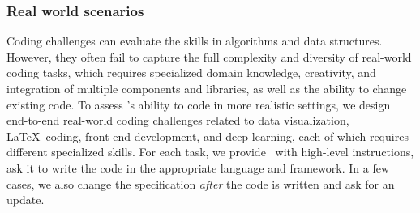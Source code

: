 









\subsubsection{Real world scenarios}
Coding challenges can evaluate the skills in algorithms and data structures. However, they often fail to capture the full complexity and diversity of real-world coding tasks, which requires specialized domain knowledge, creativity, and integration of multiple components and libraries, as well as the ability to change existing code. 
To assess \DV's ability to code in more realistic settings, we design end-to-end real-world coding challenges related to data visualization, \LaTeX\ coding, front-end development, and deep learning, each of which requires different specialized skills.
For each task, we provide \DV\ with high-level instructions, ask it to write the code in the appropriate language and framework. In a few cases, we also change the specification \emph{after} the code is written and ask for an update.

